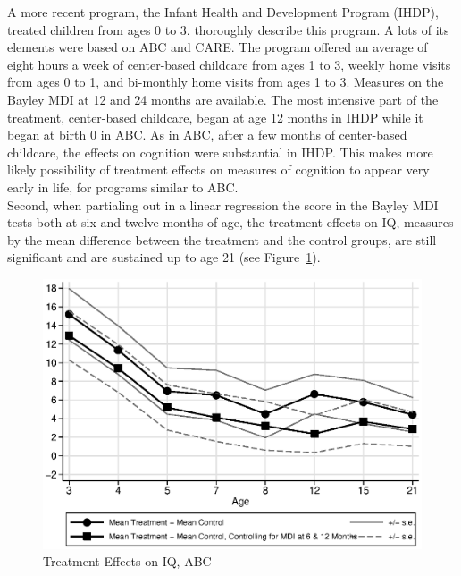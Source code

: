 \noindent A more recent program, the Infant Health and Development Program (IHDP), treated children from ages 0 to 3. \citet{Gross_Spiker_etal_1997_BOOKHelpinglowbirth} thoroughly describe this program. A lots of its elements were based on ABC and CARE. The program offered an average of eight hours a week of center-based childcare from ages 1 to 3, weekly home visits from ages 0 to 1, and bi-monthly home visits from ages 1 to 3. Measures on the Bayley MDI at 12 and 24 months are available. The most intensive part of the treatment, center-based childcare, began at age 12 months in IHDP while it began at birth 0 in ABC. As in ABC, after a few months of center-based childcare, the effects on cognition were substantial in IHDP. This makes more likely possibility of treatment effects on measures of cognition to appear very early in life, for programs similar to ABC.\\

\noindent Second, when partialing out in a linear regression the score in the Bayley MDI tests both at six and twelve months of age, the treatment effects on IQ, measures by the mean difference between the treatment and the control groups, are still significant and are sustained up to age 21 (see Figure~\ref{fig:treatiqsabc}).

\begin{figure}[H]
		\caption{Treatment Effects on IQ, ABC} \label{fig:treatiqsabc}
		\includegraphics[width=.9\columnwidth]{output/abc_mdifixing_2.eps}
\end{figure}

 